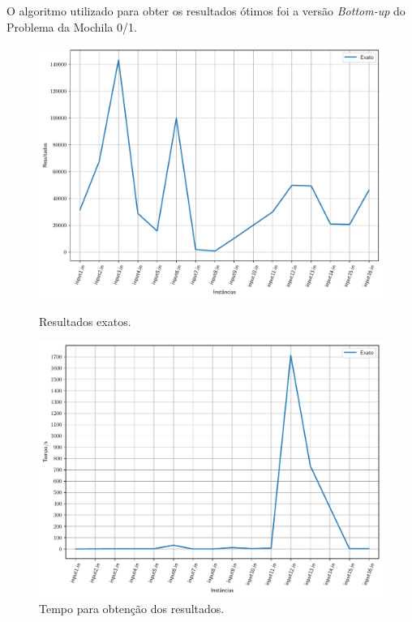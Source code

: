 \documentclass[a4paper, 12pt]{article}
\begin{document}
O algoritmo utilizado para obter os resultados ótimos foi a versão \textit{Bottom-up} do Problema da Mochila 0/1.

\begin{figure}[!htb]
    \centering
    \begin{minipage}{0.5\textwidth}
        \centering
        \includegraphics[width=1\linewidth]{../imgs/exact_results.pdf}
        \caption{Resultados exatos.}
        \label{exact_results}
    \end{minipage}%
    \begin{minipage}{0.5\textwidth}
        \centering
        \includegraphics[width=1\linewidth]{../imgs/exact_time.pdf}
        \caption{Tempo para obtenção dos resultados.}
        \label{exact_time}
    \end{minipage}
\end{figure}
\end{document}

